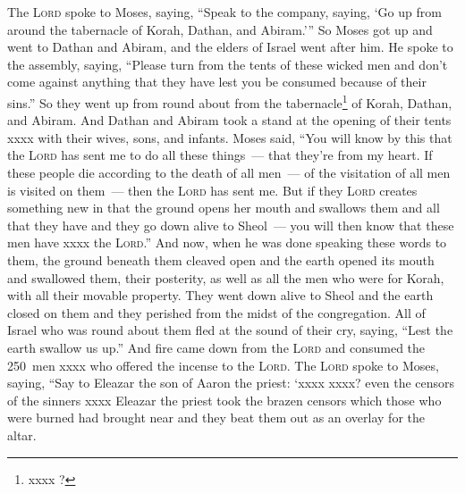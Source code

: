 \begin{inparaenum}
     The \textsc{Lord} spoke to Moses, saying,%
     ``Speak to the company, saying, `Go up from around the tabernacle of Korah, Dathan, and Abiram.'\thinspace''%
     So Moses got up and went to Dathan and Abiram, and the elders of Israel went after him.%
     He spoke to the assembly, saying, ``Please turn from the tents of these wicked men and don't come against anything that they have lest you be consumed because of their sins.''%
     So they went up from round about from the tabernacle\footnote{xxxx ?} of Korah, Dathan, and Abiram. And Dathan and Abiram took a stand at the opening of their tents xxxx with their wives, sons, and infants.%
     Moses said, ``You will know by this that the \textsc{Lord} has sent me to do all these things~--- that they're from my heart.%
     If these people die according to the death of all men~--- of the visitation of all men is visited on them~--- then the \textsc{Lord} has sent me.%
     But if they \textsc{Lord} creates something new in that the ground opens her mouth and swallows them and all that they have and they go down alive to Sheol~--- you will then know that these men have xxxx the \textsc{Lord}.''%
     And now, when he was done speaking these words to them, the ground beneath them cleaved open\understood%
     and the earth opened its mouth and swallowed them, their posterity, as well as all the men who were for Korah, with all their movable property.%
     They went down alive to Sheol and the earth closed on them and they perished from the midst of the congregation.%
     All of Israel who was round about them fled at the sound of their cry, saying, ``Lest the earth swallow us up.''%
     And fire came down from the \textsc{Lord} and consumed the 250~men xxxx who offered the incense to the \textsc{Lord}.%
     The \textsc{Lord} spoke to Moses, saying,%
     ``Say to Eleazar the son of Aaron the priest: `xxxx%
     xxxx? even the censors of the sinners xxxx%
     Eleazar the priest took the brazen censors which those who were burned had brought near and they beat them out as an overlay for the altar.%

\end{inparaenum}
